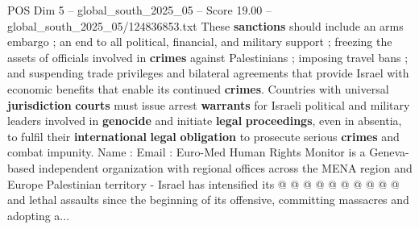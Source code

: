 \begin{textsample}{POS Dim 5 – global\_south\_2025\_05 – Score 19.00 – global\_south\_2025\_05/124836853.txt}
These \textbf{sanctions} should include an arms embargo ; an end to all political, financial, and military support ; freezing the assets of officials involved in \textbf{crimes} against Palestinians ; imposing travel bans ; and suspending trade privileges and bilateral agreements that provide Israel with economic benefits that enable its continued \textbf{crimes}.
Countries with universal \textbf{jurisdiction} \textbf{courts} must issue arrest \textbf{warrants} for Israeli political and military leaders involved in \textbf{genocide} and initiate \textbf{legal} \textbf{proceedings}, even in absentia, to fulfil their \textbf{international} \textbf{legal} \textbf{obligation} to prosecute serious \textbf{crimes} and combat impunity.
Name : Email : Euro-Med Human Rights Monitor is a Geneva-based independent organization with regional offices across the MENA region and Europe Palestinian territory - Israel has intensified its @ @ @ @ @ @ @ @ @ @ and lethal assaults since the beginning of its offensive, committing massacres and adopting a...

\end{textsample}
